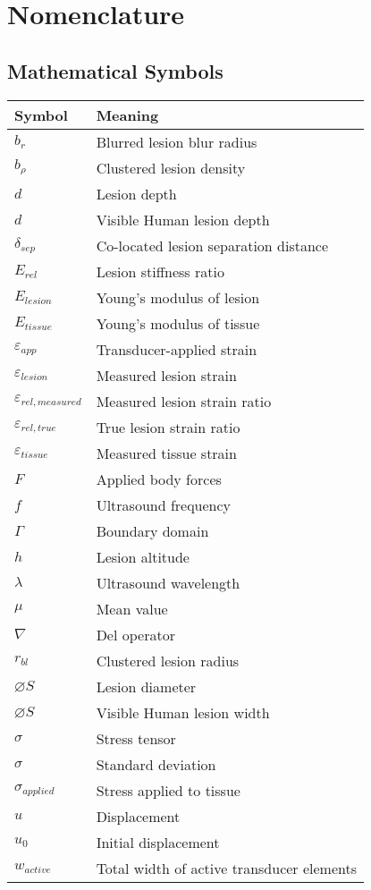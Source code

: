 \chapter*{Nomenclature}
	\section*{Mathematical Symbols}
		\begin{longtable}[l]{ll}
			Symbol & Meaning \\
			\hline \endhead
			$b_r$ & Blurred lesion blur radius \\
			$b_\rho$ & Clustered lesion density \\
			$d$ & Lesion depth \\
			$d$ & Visible Human lesion depth \\
			$\delta_{sep}$ & Co-located lesion separation distance \\
			$E_{rel}$ & Lesion stiffness ratio \\
			$E_{lesion}$ & Young's modulus of lesion \\
			$E_{tissue}$ & Young's modulus of tissue \\
			$\varepsilon_{app}$ & Transducer-applied strain \\
			$\varepsilon_{lesion}$ & Measured lesion strain \\
			$\varepsilon_{rel,measured}$ & Measured lesion strain ratio \\
			$\varepsilon_{rel,true}$ & True lesion strain ratio \\
			$\varepsilon_{tissue}$ & Measured tissue strain \\
			$F$ & Applied body forces \\
			$f$ & Ultrasound frequency \\
			$\Gamma$ & Boundary domain \\
			$h$ & Lesion altitude \\
			$\lambda$ & Ultrasound wavelength \\
			$\mu$ & Mean value \\
			$\nabla$ & Del operator \\
			$r_{bl}$ & Clustered lesion radius \\
			$\diameter S$ & Lesion diameter \\
			$\diameter S$ & Visible Human lesion width \\
			$\sigma$ & Stress tensor \\
			$\sigma$ & Standard deviation \\
			$\sigma_{applied}$ & Stress applied to tissue \\
			$u$ & Displacement \\
			$u_0$ & Initial displacement \\
			$w_{active}$ & Total width of active transducer elements \\
		\end{longtable}

